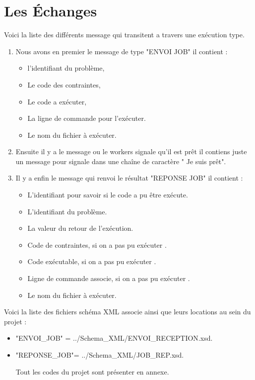 \documentclass[11pt]{article}
\begin{document}
\section{Les Échanges} 
Voici la liste des différents message qui transitent a travers une exécution type.

 
\begin{enumerate} \item Nous avons en premier le message de type "ENVOI JOB" il contient :
\begin{itemize}
\item l'identifiant du problème,
\item Le code des contraintes,
\item Le code a exécuter,
\item La ligne de  commande pour l\textquoteright exécuter.
\item Le nom du fichier à exécuter.
\end{itemize}

\item Ensuite il y a le message ou le workers signale qu'il est prêt il contiens juste un message pour signale dans une chaîne de caractère " Je suis prêt".
\item Il y a enfin le message qui renvoi le résultat "REPONSE JOB" il contient : 
\begin{itemize}
\item L'identifiant pour savoir si le code a pu être exécute.
\item L'identifiant du problème.
\item La valeur du retour de l\textquoteright exécution.
\item Code de contraintes, si on a pas pu exécuter .
\item Code exécutable, si on a pas pu exécuter .
\item Ligne de commande associe,  si on a pas pu exécuter .
\item Le nom du fichier à exécuter.
\end{itemize}
\end{enumerate}
Voici la liste des fichiers schéma XML associe ainsi que leurs locations au sein du projet :
\begin{itemize}	
\item "ENVOI\_JOB" = ../Schema\_XML/ENVOI\_RECEPTION.xsd.
\item "REPONSE\_JOB"= ../Schema\_XML/JOB\_REP.xsd.

Tout les codes du projet sont présenter en annexe.
\end{itemize}
\end{document}
